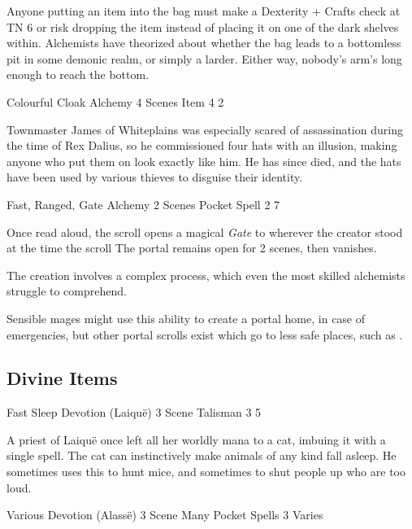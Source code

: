 \begin{multicols}{2}
Anyone putting an item into the bag must make a Dexterity + Crafts check at TN 6 or risk dropping the item instead of placing it on one of the dark shelves within.
Alchemists have theorized about whether the bag leads to a bottomless pit in some demonic realm, or simply a larder.
Either way, nobody's arm's long enough to reach the bottom.

  {Colourful Cloak}%
  {Alchemy}%
  {4 Scenes}%
  {Item}%
  {4}%
  {2}%

Townmaster James of Whiteplains was especially scared of assassination during the time of Rex Dalius, so he commissioned four hats with an illusion, making anyone who put them on look exactly like him.
He has since died, and the hats have been used by various thieves to disguise their identity.

  {Fast, Ranged, Gate}%
  {Alchemy}%
  {2 Scenes}%
  {Pocket Spell}%
  {2}%
  {7}%

\label{portalscroll}

Once read aloud, the scroll opens a magical \textit{Gate} to wherever the creator stood at the time the scroll 
The portal remains open for 2 scenes, then vanishes.

The creation involves a complex process, which even the most skilled alchemists struggle to comprehend.

Sensible mages might use this ability to create a portal home, in case of emergencies, but other portal scrolls exist which go to less safe places, such as .

\subsection{Divine Items}

  {Fast Sleep}%
  {Devotion (Laiqu\"{e})}%
  {3 Scene}%
  {Talisman}%
  {3}%
  {5}%

A priest of Laiqu\"{e} once left all her worldly mana to a cat, imbuing it with a single spell.
The cat can instinctively make animals of any kind fall asleep.
He sometimes uses this to hunt mice, and sometimes to shut people up who are too loud.

  {Various}%
  {Devotion (Alass\"{e})}%
  {3 Scene}%
  {Many Pocket Spells}%
  {3}%
  {Varies}\label{deckofmanythings}%


\end{multicols}
